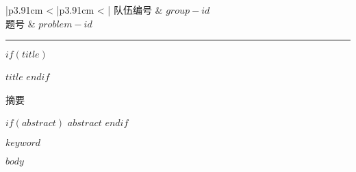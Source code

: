 \documentclass[zihao = -4]{ctexart}
\begin{document}
\newpage

\renewcommand\arraystretch{1.65}
\begin{table}[h]
\centering
\begin{tabular}{|p{3.91cm} < {\centering}|p{3.91cm} < {\centering}|}
\hline
\small 队伍编号   & \small $group-id$ \\ 
\hline
\small 题号       & \small $problem-id$ \\ 
\hline
\end{tabular}
\end{table}

\begin{center}
\rule[0.825cm]{17cm}{1pt}
\end{center}

\vspace{-27.5pt}

$if(title)$
\begin{center}
{ \heiti $title$}
\vspace{3ex}
$endif$

{{\heiti {} 摘\quad 要}}
\end{center}

$if(abstract)$
$abstract$
$endif$

{\vspace{4ex}}
$keyword$

\thispagestyle{empty}

\newpage
\begin{center} %
\begin{spacing}{1.35} %
\tableofcontents
\end{spacing}
\end{center}

\setcounter{page}{0}
\thispagestyle{empty}

\newpage
$body$
\end{document}
